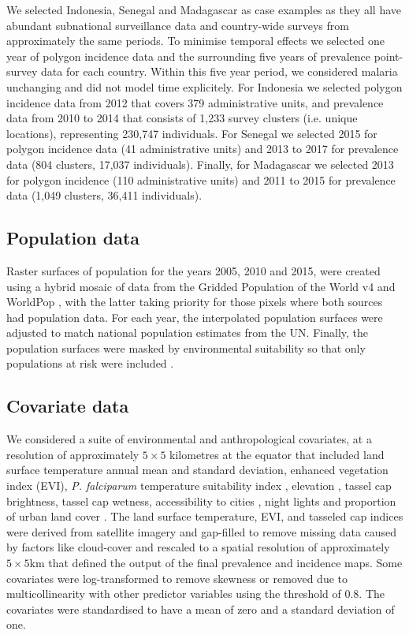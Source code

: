\documentclass{statsoc}
\begin{document}
We selected Indonesia, Senegal and Madagascar as case examples as they all have abundant subnational surveillance data and country-wide surveys from approximately the same periods.
To minimise temporal effects we selected one year of polygon incidence data and the surrounding five years of prevalence point-survey data for each country.
Within this five year period, we considered malaria unchanging and did not model time explicitely.
For Indonesia we selected polygon incidence data from 2012 that covers 379 administrative units, and prevalence data from 2010 to 2014 that consists of 1,233 survey clusters (i.e. unique locations), representing 230,747 individuals.
For Senegal we selected 2015 for polygon incidence data (41 administrative units) and 2013 to 2017 for prevalence data (804 clusters, 17,037 individuals).
Finally, for Madagascar we selected 2013 for polygon incidence (110 administrative units) and 2011 to 2015 for prevalence data (1,049 clusters, 36,411 individuals).


\subsection*{Population data}

Raster surfaces of population for the years 2005, 2010 and 2015, were created using a hybrid mosaic of data from the Gridded Population of the World v4 \citep{gpw4} and WorldPop \citep{tatem2017worldpop}, with the latter taking priority for those pixels where both sources had population data.
For each year, the interpolated population surfaces were adjusted to match national population estimates from the UN. 
Finally, the population surfaces were masked by environmental suitability so that only populations at risk were included \citep{weiss2019mapping}.


\subsection*{Covariate data}

We considered a suite of environmental and anthropological covariates, at a resolution of approximately $5 \times 5$ kilometres at the equator that included land surface temperature annual mean and standard deviation, enhanced vegetation index (EVI), \emph{P. falciparum} temperature suitability index \citep{weiss2014air}, elevation \citep{SRTMElev}, tassel cap brightness, tassel cap wetness, accessibility to cities \citep{weiss2018global}, night lights \citep{elvidge2017viirs} and proportion of urban land cover \citep{GUF}. %
The land surface temperature, EVI, and tasseled cap indices were derived from satellite imagery and gap-filled to remove missing data caused by factors like cloud-cover \citep{weiss2014effective} and rescaled to a spatial resolution of approximately $5\times 5$km \citep{weiss2015re} that defined the output of the final prevalence and incidence maps.
Some covariates were log-transformed to remove skewness or removed due to multicollinearity with other predictor variables using the threshold of 0.8. %
The covariates were standardised to have a mean of zero and a standard deviation of one.
\end{document}
